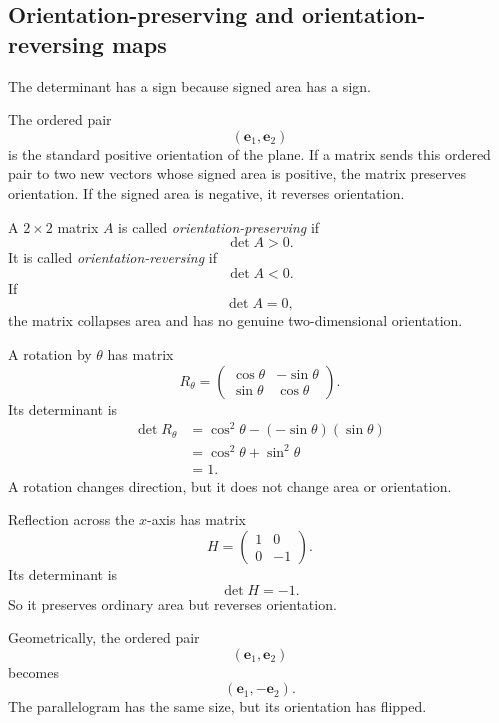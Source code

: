 \subsection{Orientation-preserving and orientation-reversing maps}

The determinant has a sign because signed area has a sign.

The ordered pair
\[
    (\mathbf e_1,\mathbf e_2)
\]
is the standard positive orientation of the plane.  If a matrix sends this ordered pair to
two new vectors whose signed area is positive, the matrix preserves orientation.  If the
signed area is negative, it reverses orientation.

\begin{definition}
A \(2\times2\) matrix \(A\) is called \emph{orientation-preserving} if
\[
    \det A>0.
\]
It is called \emph{orientation-reversing} if
\[
    \det A<0.
\]
If
\[
    \det A=0,
\]
the matrix collapses area and has no genuine two-dimensional orientation.
\end{definition}

\begin{example}
A rotation by \(\theta\) has matrix
\[
    R_\theta=
    \begin{pmatrix}
        \cos\theta&-\sin\theta\\
        \sin\theta&\cos\theta
    \end{pmatrix}.
\]
Its determinant is
\[
\begin{aligned}
    \det R_\theta
    &=
    \cos^2\theta-(-\sin\theta)(\sin\theta)\\
    &=
    \cos^2\theta+\sin^2\theta\\
    &=
    1.
\end{aligned}
\]
A rotation changes direction, but it does not change area or orientation.
\end{example}

\begin{example}
Reflection across the \(x\)-axis has matrix
\[
    H=
    \begin{pmatrix}
        1&0\\
        0&-1
    \end{pmatrix}.
\]
Its determinant is
\[
    \det H=-1.
\]
So it preserves ordinary area but reverses orientation.

Geometrically, the ordered pair
\[
    (\mathbf e_1,\mathbf e_2)
\]
becomes
\[
    (\mathbf e_1,-\mathbf e_2).
\]
The parallelogram has the same size, but its orientation has flipped.
\end{example}

